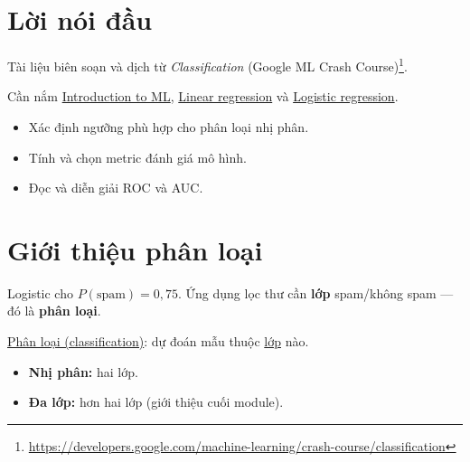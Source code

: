 \documentclass[12pt,a4paper]{article}
\begin{document}

\newpage
\tableofcontents
\newpage

\section*{Lời nói đầu}

\begin{ynghia}[title={Nguồn và cách đọc}]
Tài liệu biên soạn và dịch từ \emph{Classification} (Google ML Crash Course)\footnote{\url{https://developers.google.com/machine-learning/crash-course/classification}}.
\end{ynghia}

\begin{luuy}[title={Điều kiện tiên quyết}]
Cần nắm \href{https://developers.google.com/machine-learning/intro-to-ml}{Introduction to ML}, \href{https://developers.google.com/machine-learning/crash-course/linear-regression}{Linear regression} và \href{https://developers.google.com/machine-learning/crash-course/logistic-regression}{Logistic regression}.
\end{luuy}

\begin{phuongphap}[title={target học tập}]
\begin{itemize}
  \item Xác định ngưỡng phù hợp cho phân loại nhị phân.
  \item Tính và chọn metric đánh giá mô hình.
  \item Đọc và diễn giải ROC và AUC.
\end{itemize}
\end{phuongphap}

\newpage

\section{Giới thiệu phân loại}

\begin{dongco}[title={Từ 75\% spam sang lớp ``spam''}]
Logistic cho $P(\text{spam})=0{,}75$. Ứng dụng lọc thư cần \textbf{lớp} spam/không spam --- đó là \textbf{phân loại}.
\end{dongco}

\begin{dinhnghia}[title={Phân loại}]
\href{https://developers.google.com/machine-learning/glossary\#classification-model}{Phân loại (classification)}: dự đoán mẫu thuộc \href{https://developers.google.com/machine-learning/glossary\#class}{lớp} nào.
\begin{itemize}
  \item \textbf{Nhị phân:} hai lớp.
  \item \textbf{Đa lớp:} hơn hai lớp (giới thiệu cuối module).
\end{itemize}
\end{dinhnghia}
\end{document}
